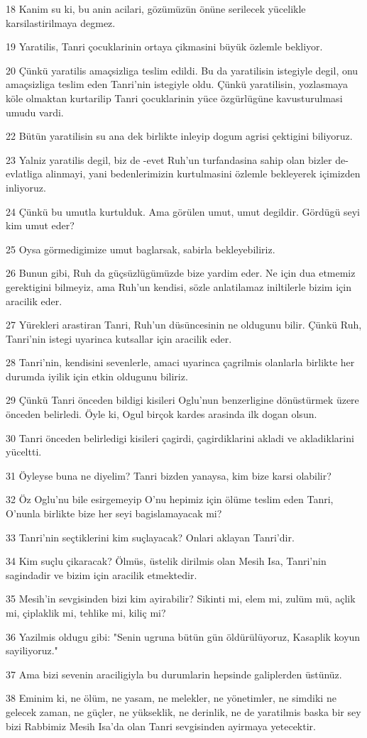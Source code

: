 \par 18 Kanim su ki, bu anin acilari, gözümüzün önüne serilecek yücelikle karsilastirilmaya degmez.
\par 19 Yaratilis, Tanri çocuklarinin ortaya çikmasini büyük özlemle bekliyor.
\par 20 Çünkü yaratilis amaçsizliga teslim edildi. Bu da yaratilisin istegiyle degil, onu amaçsizliga teslim eden Tanri'nin istegiyle oldu. Çünkü yaratilisin, yozlasmaya köle olmaktan kurtarilip Tanri çocuklarinin yüce özgürlügüne kavusturulmasi umudu vardi.
\par 22 Bütün yaratilisin su ana dek birlikte inleyip dogum agrisi çektigini biliyoruz.
\par 23 Yalniz yaratilis degil, biz de -evet Ruh'un turfandasina sahip olan bizler de- evlatliga alinmayi, yani bedenlerimizin kurtulmasini özlemle bekleyerek içimizden inliyoruz.
\par 24 Çünkü bu umutla kurtulduk. Ama görülen umut, umut degildir. Gördügü seyi kim umut eder?
\par 25 Oysa görmedigimize umut baglarsak, sabirla bekleyebiliriz.
\par 26 Bunun gibi, Ruh da güçsüzlügümüzde bize yardim eder. Ne için dua etmemiz gerektigini bilmeyiz, ama Ruh'un kendisi, sözle anlatilamaz iniltilerle bizim için aracilik eder.
\par 27 Yürekleri arastiran Tanri, Ruh'un düsüncesinin ne oldugunu bilir. Çünkü Ruh, Tanri'nin istegi uyarinca kutsallar için aracilik eder.
\par 28 Tanri'nin, kendisini sevenlerle, amaci uyarinca çagrilmis olanlarla birlikte her durumda iyilik için etkin oldugunu biliriz.
\par 29 Çünkü Tanri önceden bildigi kisileri Oglu'nun benzerligine dönüstürmek üzere önceden belirledi. Öyle ki, Ogul birçok kardes arasinda ilk dogan olsun.
\par 30 Tanri önceden belirledigi kisileri çagirdi, çagirdiklarini akladi ve akladiklarini yüceltti.
\par 31 Öyleyse buna ne diyelim? Tanri bizden yanaysa, kim bize karsi olabilir?
\par 32 Öz Oglu'nu bile esirgemeyip O'nu hepimiz için ölüme teslim eden Tanri, O'nunla birlikte bize her seyi bagislamayacak mi?
\par 33 Tanri'nin seçtiklerini kim suçlayacak? Onlari aklayan Tanri'dir.
\par 34 Kim suçlu çikaracak? Ölmüs, üstelik dirilmis olan Mesih Isa, Tanri'nin sagindadir ve bizim için aracilik etmektedir.
\par 35 Mesih'in sevgisinden bizi kim ayirabilir? Sikinti mi, elem mi, zulüm mü, açlik mi, çiplaklik mi, tehlike mi, kiliç mi?
\par 36 Yazilmis oldugu gibi: "Senin ugruna bütün gün öldürülüyoruz, Kasaplik koyun sayiliyoruz."
\par 37 Ama bizi sevenin araciligiyla bu durumlarin hepsinde galiplerden üstünüz.
\par 38 Eminim ki, ne ölüm, ne yasam, ne melekler, ne yönetimler, ne simdiki ne gelecek zaman, ne güçler, ne yükseklik, ne derinlik, ne de yaratilmis baska bir sey bizi Rabbimiz Mesih Isa'da olan Tanri sevgisinden ayirmaya yetecektir.

